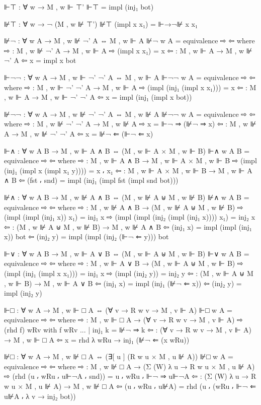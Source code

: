 \begin{spverbatim}
  ⊩⊤ : ∀ {w} → M , w ⊩ ⊤'
  ⊩⊤ = impl (inj₁ bot)

  ⊮⊤ : ∀ {w} → ¬ (M , w ⊮ ⊤')
  ⊮⊤ (impl x x₁) = ⊩→¬⊮ x x₁

  ⊮¬ : ∀ {w A} → M , w ⊮ ¬' A ⇔ M , w ⊩ A
  ⊮¬ {w} {A} = equivalence ⇨ ⇦
    where
      ⇨ : M , w ⊮ ¬' A → M , w ⊩ A
      ⇨ (impl x x₁) = x
      ⇦ : M , w ⊩ A → M , w ⊮ ¬' A
      ⇦ x = impl x bot

  ⊩¬¬ : ∀ {w A} → M , w ⊩ ¬' ¬' A ⇔ M , w ⊩ A
  ⊩¬¬ {w} {A} = equivalence ⇨ ⇦
    where
    ⇨ : M , w ⊩ ¬' ¬' A → M , w ⊩ A
    ⇨ (impl (inj₁ (impl x x₁))) = x
    ⇦ : M , w ⊩ A → M , w ⊩ ¬' ¬' A
    ⇦ x = impl (inj₁ (impl x bot))

  ⊮¬¬ : ∀ {w A} → M , w ⊮ ¬' ¬' A ⇔ M , w ⊮ A
  ⊮¬¬ {w} {A} = equivalence ⇨ ⇦
    where
    ⇨ : M , w ⊮ ¬' ¬' A → M , w ⊮ A
    ⇨ x = ⊩¬ ⇒ (⊮¬ ⇒ x)
    ⇦ : M , w ⊮ A → M , w ⊮ ¬' ¬' A
    ⇦ x = ⊮¬ ⇐ (⊩¬ ⇐ x)

  ⊩∧ : ∀ {w A B} → M , w ⊩ A ∧ B ⇔ (M , w ⊩ A × M , w ⊩ B)
  ⊩∧ {w} {A} {B} = equivalence ⇨ ⇦
    where
    ⇨ : M , w ⊩ A ∧ B → M , w ⊩ A × M , w ⊩ B
    ⇨ (impl (inj₁ (impl x (impl x₁ y)))) = x ⸴ x₁
    ⇦ : M , w ⊩ A × M , w ⊩ B → M , w ⊩ A ∧ B
    ⇦ (fst ⸴ snd) = impl (inj₁ (impl fst (impl snd bot)))

  ⊮∧ : ∀ {w A B} → M , w ⊮ A ∧ B ⇔ (M , w ⊮ A ⊎ M , w ⊮ B)
  ⊮∧ {w} {A} {B} = equivalence ⇨ ⇦
    where
    ⇨ : M , w ⊮ A ∧ B → (M , w ⊮ A ⊎ M , w ⊮ B)
    ⇨ (impl (impl (inj₁ x)) x₁) = inj₁ x
    ⇨ (impl (impl (inj₂ (impl (inj₁ x)))) x₁) = inj₂ x
    ⇦ : (M , w ⊮ A ⊎ M , w ⊮ B) → M , w ⊮ A ∧ B
    ⇦ (inj₁ x) = impl (impl (inj₁ x)) bot
    ⇦ (inj₂ y) = impl (impl (inj₂ (⊩¬ ⇐ y))) bot

  ⊩∨ : ∀ {w A B} → M , w ⊩ A ∨ B ⇔ (M , w ⊩ A ⊎ M , w ⊩ B)
  ⊩∨ {w} {A} {B} = equivalence ⇨ ⇦
    where
    ⇨ : M , w ⊩ A ∨ B → (M , w ⊩ A ⊎ M , w ⊩ B)
    ⇨ (impl (inj₁ (impl x x₁))) = inj₁ x
    ⇨ (impl (inj₂ y)) = inj₂ y
    ⇦ : (M , w ⊩ A ⊎ M , w ⊩ B) → M , w ⊩ A ∨ B
    ⇦ (inj₁ x) = impl (inj₁ (⊮¬ ⇐ x))
    ⇦ (inj₂ y) = impl (inj₂ y)

  ⊩□ : ∀ {w A} → M , w ⊩ □ A ⇔ (∀ {v} → R w v → M , v ⊩ A)
  ⊩□ {w} {A} = equivalence ⇨ ⇦
    where
    ⇨ : M , w ⊩ □ A → (∀ {v} → R w v → M , v ⊩ A)
    ⇨ (rhd f) wRv with f wRv
    ... | inj₁ k = ⊮¬ ⇒ k
    ⇦ : (∀ {v} → R w v → M , v ⊩ A) → M , w ⊩ □ A
    ⇦ x = rhd λ wRu → inj₁ (⊮¬ ⇐ (x wRu))

  ⊮□ : ∀ {w A} → M , w ⊮ □ A ⇔ (∃[ u ] (R w u × M , u ⊮ A))
  ⊮□ {w} {A} = equivalence ⇨ ⇦
    where
    ⇨ : M , w ⊮ □ A → (Σ (W) λ u → R w u × M , u ⊮ A)
    ⇨ (rhd (u ⸴ wRu ⸴ u⊩¬A ⸴ snd)) = u ⸴ wRu ⸴ ⊩¬ ⇒ u⊩¬A
    ⇦ : (Σ (W) λ u → R w u × M , u ⊮ A) → M , w ⊮ □ A
    ⇦ (u ⸴ wRu ⸴ u⊮A) = rhd (u ⸴ (wRu ⸴ ⊩¬ ⇐ u⊮A ⸴ λ v → inj₂ bot))


\end{spverbatim}
